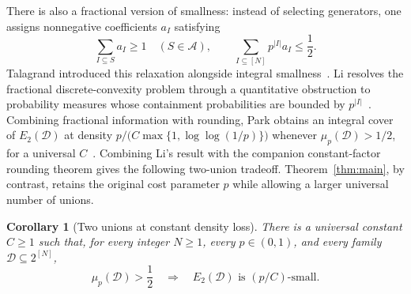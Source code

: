 \documentclass[11pt,letterpaper]{article}
\newtheorem{corollary}[theorem]{Corollary}
\theoremstyle{definition}
\theoremstyle{remark}
\numberwithin{equation}{section}
\begin{document}
There is also a fractional version of smallness: instead of selecting
generators, one assigns nonnegative coefficients $a_I$ satisfying
\[
\sum_{I\subseteq S}a_I\ge1\quad(S\in\mathcal A),
\qquad
\sum_{I\subseteq[N]}p^{|I|}a_I\le\frac12.
\]
Talagrand introduced this relaxation alongside integral
smallness~\cite[Sections~6 and~7]{Talagrand10}.
Li resolves the fractional discrete-convexity problem through a quantitative
obstruction to probability measures whose containment probabilities
are bounded by $p^{|I|}$~\cite[Theorem~1.9]{Li26}.
Combining fractional information with rounding, Park obtains an integral
cover of $E_2(\mathcal D)$ at density
$p/\bigl(C\max\{1,\log\log(1/p)\}\bigr)$
whenever $\mu_p(\mathcal D)>1/2$, for a universal
$C$~\cite[Corollary~3.5]{Park26}.
Combining Li's result with the companion constant-factor rounding theorem
gives the following two-union tradeoff. Theorem~\ref{thm:main}, by contrast,
retains the original cost parameter $p$ while allowing a larger universal
number of unions.

\begin{corollary}[Two unions at constant density loss]
\label{cor:two-union}
There is a universal constant $C\ge1$ such that, for every integer $N\ge1$,
every $p\in(0,1)$, and every family $\mathcal D\subseteq2^{[N]}$,
\[
\mu_p(\mathcal D)>\frac12
\quad\Longrightarrow\quad
E_2(\mathcal D)\text{ is }(p/C)\text{-small}.
\]
\end{corollary}
\end{document}

